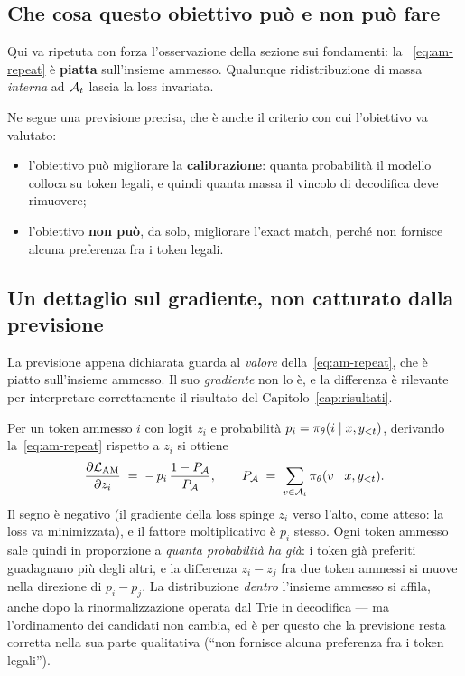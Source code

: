 \subsection{Che cosa questo obiettivo può e non può fare}

Qui va ripetuta con forza l'osservazione della sezione sui fondamenti: la
~\eqref{eq:am-repeat} è \textbf{piatta} sull'insieme ammesso. Qualunque
ridistribuzione di massa \emph{interna} ad $\mathcal{A}_t$ lascia la loss
invariata.

Ne segue una previsione precisa, che è anche il criterio con cui l'obiettivo va
valutato:
\begin{itemize}
  \item l'obiettivo può migliorare la \textbf{calibrazione}: quanta probabilità
        il modello colloca su token legali, e quindi quanta massa il vincolo di
        decodifica deve rimuovere;
  \item l'obiettivo \textbf{non può}, da solo, migliorare l'exact match, perché
        non fornisce alcuna preferenza fra i token legali.
\end{itemize}

\subsection{Un dettaglio sul gradiente, non catturato dalla previsione}
\label{sec:am-gradiente}

La previsione appena dichiarata guarda al \emph{valore} della~\eqref{eq:am-repeat},
che è piatto sull'insieme ammesso. Il suo \emph{gradiente} non lo è, e la
differenza è rilevante per interpretare correttamente il risultato del
Capitolo~\ref{cap:risultati}.

Per un token ammesso $i$ con logit $z_i$ e probabilità $p_i = \pi_\theta(i \mid x,
y_{<t})$, derivando la~\eqref{eq:am-repeat} rispetto a $z_i$ si ottiene
\begin{equation}
  \label{eq:am-gradient}
  \frac{\partial \mathcal{L}_{\text{AM}}}{\partial z_i}
  \;=\; -\, p_i \, \frac{1 - P_{\mathcal{A}}}{P_{\mathcal{A}}},
  \qquad
  P_{\mathcal{A}} \;=\; \sum_{v \in \mathcal{A}_t} \pi_\theta(v \mid x, y_{<t}).
\end{equation}
Il segno è negativo (il gradiente della loss spinge $z_i$ verso l'alto, come
atteso: la loss va minimizzata), e il fattore moltiplicativo è $p_i$ stesso.
Ogni token ammesso sale quindi in proporzione a \emph{quanta probabilità ha già}:
i token già preferiti guadagnano più degli altri, e la differenza $z_i - z_j$
fra due token ammessi si muove nella direzione di $p_i - p_j$. La distribuzione
\emph{dentro} l'insieme ammesso si affila, anche dopo la rinormalizzazione
operata dal Trie in decodifica — ma l'ordinamento dei candidati non cambia, ed
è per questo che la previsione resta corretta nella sua parte qualitativa
(``non fornisce alcuna preferenza fra i token legali'').

